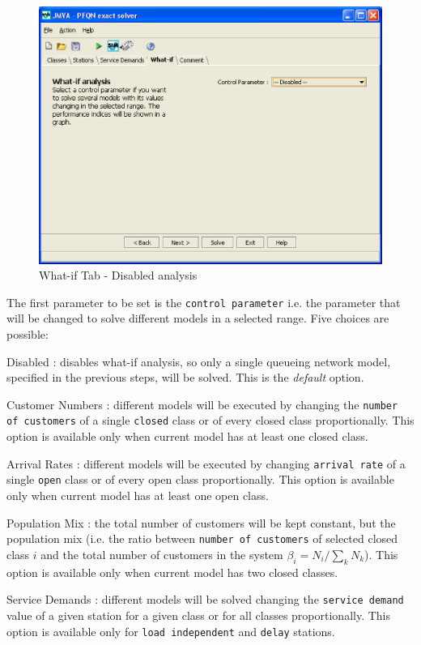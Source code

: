 \begin{figure}[htbp]
    \begin{center}
        \includegraphics[scale=.5]{img/jmva/whatifDisabled}
    \end{center}
    \caption{What-if Tab - Disabled analysis}
    \label{fig:jmva:whatifDisabled}
\end{figure}

The first parameter to be set is the \texttt{control parameter} i.e.
the parameter that will be changed to solve different models in a
selected range. Five choices are possible:
\begin{description*}
\item[Disabled :] disables what-if analysis, so only a single queueing network
model, specified in the previous steps, will be solved. This is the
\emph{default} option.
\item[Customer Numbers :] different models will be
executed by changing the \texttt{number of customers} of a single
\texttt{closed} class or of every closed class proportionally. This
option is available only when current model has at least one closed
class.
\item[Arrival Rates :] different models will be
executed by changing \texttt{arrival rate} of a single \texttt{open}
class or of every open class proportionally. This option is
available only when current model has at least one open class.
\item[Population Mix :] the total number of customers will be kept
constant, but the population mix (i.e. the ratio between
\texttt{number of customers} of selected closed class $i$ and the
total number of customers in the system $\beta_i = N_i / \sum_k
N_k$). This option is available only when current model has two
closed classes.
\item[Service Demands :] different models will be solved changing
the \texttt{service demand} value of a given station for a given
class or for all classes proportionally. This option is available
only for \texttt{load independent} and \texttt{delay} stations.
\end{description*}

